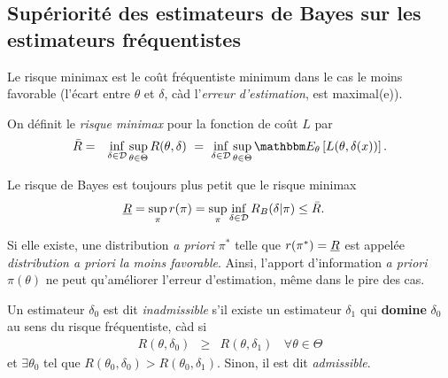 \if{} 
\fi

\vspace{1cm}



\subsection{Supériorité des estimateurs de Bayes sur les estimateurs fréquentistes}

Le risque minimax est le {co\^ut fréquentiste minimum dans le cas le moins favorable} (l'écart entre $\theta$ et $\delta$, càd l'{\it erreur d'estimation}, est maximal(e)).

\begin{definition}
On définit le  \emph{ \emph{risque minimax}} pour la fonction de co\^ut $L$ par
\begin{eqnarray*}
\bar{R} & = & \inf\limits_{\delta\in{\cal{D}}}  \sup\limits_{\theta\in\Theta} R(\theta,\delta) \ = \ \inf\limits_{\delta\in{\cal{D}}}  \sup\limits_{\theta\in\Theta} \E_{\theta}\left[L(\theta,\delta(x))\right].
\end{eqnarray*}
\end{definition}

\begin{theorem}
Le risque de Bayes est toujours plus petit que le risque minimax
\begin{eqnarray*}
 \emph{R} = \sup\limits_{\pi} r(\pi) = \sup\limits_{\pi} \inf\limits_{\delta\in{\cal{D}}} R_B(\delta|\pi) & \leq  \bar{R}.
\end{eqnarray*}
\end{theorem}

Si elle existe, une distribution {\it a priori} $\pi^*$ telle que $r(\pi^*)= \emph{R}$ est appelée  \emph{\it distribution a priori la moins favorable}. Ainsi, l'apport d'information {\it a priori} $\pi(\theta)$ ne peut qu'améliorer l'erreur d'estimation, m\^eme dans le pire des cas. \\

\begin{definition}\label{inadmin}
Un estimateur $\delta_0$ est dit  \emph{inadmissible} s'il existe un estimateur $\delta_1$ qui {\bf domine} $\delta_0$ au sens du risque fréquentiste, càd si 
\begin{eqnarray*}
R(\theta,\delta_0) & \geq & R(\theta,\delta_1) \ \ \ \ \forall \theta\in\Theta
\end{eqnarray*}
et $\exists \theta_0$ tel que $R(\theta_0,\delta_0) > R(\theta_0,\delta_1)$. Sinon, il est dit  \emph{admissible}.
\end{definition}

